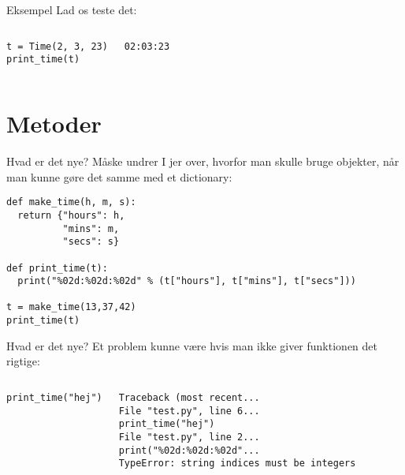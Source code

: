 \documentclass[main.tex]{subfiles}
\begin{document}
\begin{frame}[fragile]{Eksempel}
Lad os teste det:
\begin{columns}
	\begin{lstlisting}[style=python]
t = Time(2, 3, 23)
print_time(t)
	\end{lstlisting}
	\begin{lstlisting}[style=python]
02:03:23
	\end{lstlisting}
\end{columns}
\end{frame}




\section{Metoder}



\begin{frame}[fragile]{Hvad er det nye?}
Måske undrer I jer over, hvorfor man skulle bruge objekter, når man kunne gøre det samme med et dictionary:

\begin{lstlisting}[style=python]
def make_time(h, m, s):
  return {"hours": h, 
          "mins": m, 
          "secs": s}

def print_time(t):
  print("%02d:%02d:%02d" % (t["hours"], t["mins"], t["secs"]))

t = make_time(13,37,42)
print_time(t)
\end{lstlisting}
\end{frame}



\begin{frame}[fragile]{Hvad er det nye?}
Et problem kunne være hvis man ikke giver funktionen det rigtige:
\begin{columns}
\begin{lstlisting}[style=python]
print_time("hej")
\end{lstlisting}
\pause
{}
\begin{lstlisting}[style=python]
Traceback (most recent...
File "test.py", line 6...
print_time("hej")
File "test.py", line 2...
print("%02d:%02d:%02d"...
TypeError: string indices must be integers
\end{lstlisting}
\end{columns}
\end{frame}
\end{document}
